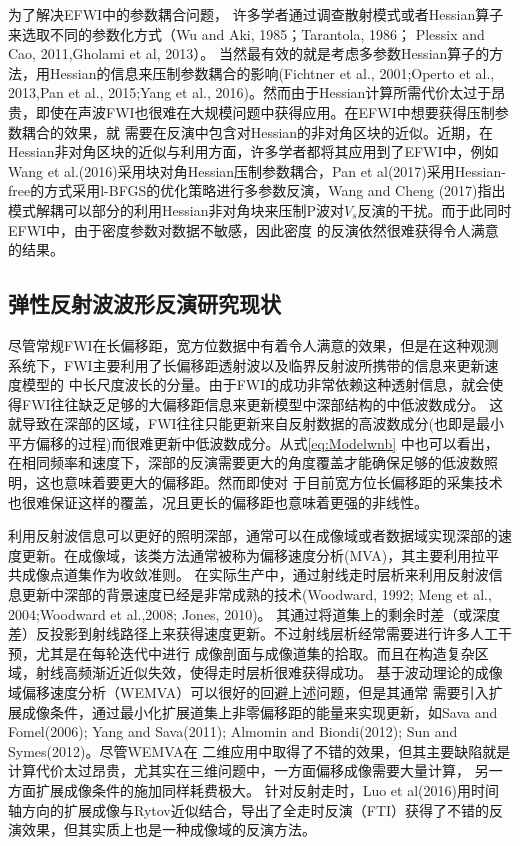 为了解决EFWI中的参数耦合问题，
许多学者通过调查散射模式或者Hessian算子来选取不同的参数化方式（Wu and Aki, 1985\cite{wu.aki:1985}；Tarantola, 1986\cite{tarantola:1986}；
Plessix and Cao, 2011\cite{plessix.cao:2011},Gholami et al, 2013\cite{gholami2013}）。
当然最有效的就是考虑多参数Hessian算子的方法，用Hessian的信息来压制参数耦合的影响(Fichtner et al., 2001\cite{fichtner2011hessian};Operto et al.,
2013\cite{operto2013guided},Pan et al., 2015\cite{pan2015estimation};Yang et al.,
2016\cite{Yang2016})。然而由于Hessian计算所需代价太过于昂贵，即使在声波FWI也很难在大规模问题中获得应用。在EFWI中想要获得压制参数耦合的效果，就
需要在反演中包含对Hessian的非对角区块的近似。近期，在Hessian非对角区块的近似与利用方面，许多学者都将其应用到了EFWI中，例如Wang
et al.(2016)\cite{WangEtAl2016}采用块对角Hessian压制参数耦合，Pan et
al(2017)\cite{PanEtAl2017}采用Hessian-free的方式采用l-BFGS的优化策略进行多参数反演，Wang and Cheng
(2017)\cite{WangEtAl2017}指出模式解耦可以部分的利用Hessian非对角块来压制P波对$V_s$反演的干扰。而于此同时EFWI中，由于密度参数对数据不敏感，因此密度
的反演依然很难获得令人满意的结果。
\subsection{弹性反射波波形反演研究现状}
尽管常规FWI在长偏移距，宽方位数据中有着令人满意的效果，但是在这种观测系统下，FWI主要利用了长偏移距透射波以及临界反射波所携带的信息来更新速度模型的
中长尺度波长的分量。由于FWI的成功非常依赖这种透射信息，就会使得FWI往往缺乏足够的大偏移距信息来更新模型中深部结构的中低波数成分。
这就导致在深部的区域，FWI往往只能更新来自反射数据的高波数成分(也即是最小平方偏移的过程)而很难更新中低波数成分。从式\ref{eq:Modelwnb}
中也可以看出，在相同频率和速度下，深部的反演需要更大的角度覆盖才能确保足够的低波数照明，这也意味着要更大的偏移距。然而即使对
于目前宽方位长偏移距的采集技术也很难保证这样的覆盖，况且更长的偏移距也意味着更强的非线性\cite{sirgue2006importance,virieux2009overview}。

利用反射波信息可以更好的照明深部，通常可以在成像域或者数据域实现深部的速度更新。在成像域，该类方法通常被称为偏移速度分析(MVA)，其主要利用拉平
共成像点道集作为收敛准则。
在实际生产中，通过射线走时层析来利用反射波信息更新中深部的背景速度已经是非常成熟的技术(Woodward,
1992\cite{Woodward1992}; Meng et al., 2004\cite{MengEtAl2004};Woodward et al.,2008\cite{
Woodward2008}; Jones, 2010\cite{Jones2010})。
其通过将道集上的剩余时差（或深度差）反投影到射线路径上来获得速度更新。不过射线层析经常需要进行许多人工干预，尤其是在每轮迭代中进行
成像剖面与成像道集的拾取。而且在构造复杂区域，射线高频渐近近似失效，使得走时层析很难获得成功。
基于波动理论的成像域偏移速度分析（WEMVA）可以很好的回避上述问题，但是其通常
需要引入扩展成像条件，通过最小化扩展道集上非零偏移距的能量来实现更新，如Sava and
Fomel(2006)\cite{SavaEtAl2006}; Yang and Sava(2011)\cite{YangEtAl2011}; Almomin and
Biondi(2012)\cite{Almomin2012}; Sun and Symes(2012)\cite{SunEtAl2012}。尽管WEMVA在
二维应用中取得了不错的效果，但其主要缺陷就是计算代价太过昂贵，尤其实在三维问题中，一方面偏移成像需要大量计算，
另一方面扩展成像条件的施加同样耗费极大。
针对反射走时，Luo et
al(2016)\cite{Luo2016}用时间轴方向的扩展成像与Rytov近似结合，导出了全走时反演（FTI）获得了不错的反演效果，但其实质上也是一种成像域的反演方法。

